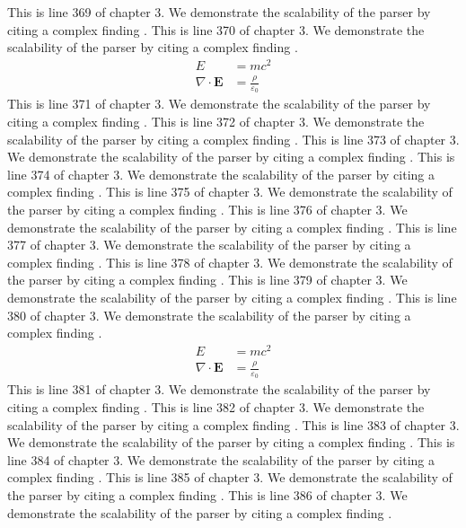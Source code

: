 This is line 369 of chapter 3. We demonstrate the scalability of the parser by citing a complex finding \cite{ref3_369}.
This is line 370 of chapter 3. We demonstrate the scalability of the parser by citing a complex finding \cite{ref3_370}.
\begin{align*}
  E &= mc^2 \\
  \nabla \cdot \mathbf{E} &= \frac{\rho}{\varepsilon_0}
\end{align*}
This is line 371 of chapter 3. We demonstrate the scalability of the parser by citing a complex finding \cite{ref3_371}.
This is line 372 of chapter 3. We demonstrate the scalability of the parser by citing a complex finding \cite{ref3_372}.
This is line 373 of chapter 3. We demonstrate the scalability of the parser by citing a complex finding \cite{ref3_373}.
This is line 374 of chapter 3. We demonstrate the scalability of the parser by citing a complex finding \cite{ref3_374}.
This is line 375 of chapter 3. We demonstrate the scalability of the parser by citing a complex finding \cite{ref3_375}.
This is line 376 of chapter 3. We demonstrate the scalability of the parser by citing a complex finding \cite{ref3_376}.
This is line 377 of chapter 3. We demonstrate the scalability of the parser by citing a complex finding \cite{ref3_377}.
This is line 378 of chapter 3. We demonstrate the scalability of the parser by citing a complex finding \cite{ref3_378}.
This is line 379 of chapter 3. We demonstrate the scalability of the parser by citing a complex finding \cite{ref3_379}.
This is line 380 of chapter 3. We demonstrate the scalability of the parser by citing a complex finding \cite{ref3_380}.
\begin{align*}
  E &= mc^2 \\
  \nabla \cdot \mathbf{E} &= \frac{\rho}{\varepsilon_0}
\end{align*}
This is line 381 of chapter 3. We demonstrate the scalability of the parser by citing a complex finding \cite{ref3_381}.
This is line 382 of chapter 3. We demonstrate the scalability of the parser by citing a complex finding \cite{ref3_382}.
This is line 383 of chapter 3. We demonstrate the scalability of the parser by citing a complex finding \cite{ref3_383}.
This is line 384 of chapter 3. We demonstrate the scalability of the parser by citing a complex finding \cite{ref3_384}.
This is line 385 of chapter 3. We demonstrate the scalability of the parser by citing a complex finding \cite{ref3_385}.
This is line 386 of chapter 3. We demonstrate the scalability of the parser by citing a complex finding \cite{ref3_386}.
